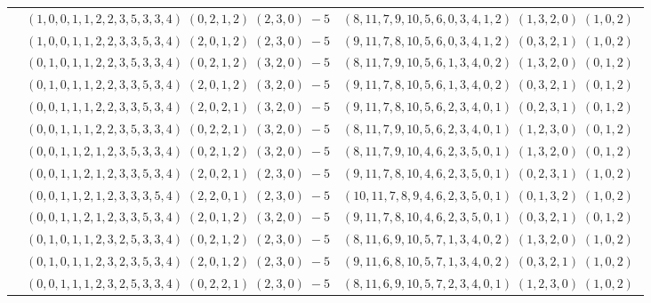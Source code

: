 \documentclass[11pt]{article}
\begin{document}
\begin{longtable}[l]{|c|c|c|}
 \cline{2-3} 
 & $(1 ,0 ,0 ,1 ,1 ,2 ,2 ,3 ,5 ,3 ,3 ,4) \;(0 ,2 ,1 ,2) \;(2 ,3 ,0) \;-5$ & $(8 ,11 ,7 ,9 ,10 ,5 ,6 ,0 ,3 ,4 ,1 ,2) \;(1 ,3 ,2 ,0) \;(1 ,0 ,2) \;$\\ 
 \cline{2-3} 
 & $(1 ,0 ,0 ,1 ,1 ,2 ,2 ,3 ,3 ,5 ,3 ,4) \;(2 ,0 ,1 ,2) \;(2 ,3 ,0) \;-5$ & $(9 ,11 ,7 ,8 ,10 ,5 ,6 ,0 ,3 ,4 ,1 ,2) \;(0 ,3 ,2 ,1) \;(1 ,0 ,2) \;$\\ 
 \cline{2-3} 
 & $(0 ,1 ,0 ,1 ,1 ,2 ,2 ,3 ,5 ,3 ,3 ,4) \;(0 ,2 ,1 ,2) \;(3 ,2 ,0) \;-5$ & $(8 ,11 ,7 ,9 ,10 ,5 ,6 ,1 ,3 ,4 ,0 ,2) \;(1 ,3 ,2 ,0) \;(0 ,1 ,2) \;$\\ 
 \cline{2-3} 
 & $(0 ,1 ,0 ,1 ,1 ,2 ,2 ,3 ,3 ,5 ,3 ,4) \;(2 ,0 ,1 ,2) \;(3 ,2 ,0) \;-5$ & $(9 ,11 ,7 ,8 ,10 ,5 ,6 ,1 ,3 ,4 ,0 ,2) \;(0 ,3 ,2 ,1) \;(0 ,1 ,2) \;$\\ 
 \cline{2-3} 
 & $(0 ,0 ,1 ,1 ,1 ,2 ,2 ,3 ,3 ,5 ,3 ,4) \;(2 ,0 ,2 ,1) \;(3 ,2 ,0) \;-5$ & $(9 ,11 ,7 ,8 ,10 ,5 ,6 ,2 ,3 ,4 ,0 ,1) \;(0 ,2 ,3 ,1) \;(0 ,1 ,2) \;$\\ 
 \cline{2-3} 
 & $(0 ,0 ,1 ,1 ,1 ,2 ,2 ,3 ,5 ,3 ,3 ,4) \;(0 ,2 ,2 ,1) \;(3 ,2 ,0) \;-5$ & $(8 ,11 ,7 ,9 ,10 ,5 ,6 ,2 ,3 ,4 ,0 ,1) \;(1 ,2 ,3 ,0) \;(0 ,1 ,2) \;$\\ 
 \cline{2-3} 
 & $(0 ,0 ,1 ,1 ,2 ,1 ,2 ,3 ,5 ,3 ,3 ,4) \;(0 ,2 ,1 ,2) \;(3 ,2 ,0) \;-5$ & $(8 ,11 ,7 ,9 ,10 ,4 ,6 ,2 ,3 ,5 ,0 ,1) \;(1 ,3 ,2 ,0) \;(0 ,1 ,2) \;$\\ 
 \cline{2-3} 
 & $(0 ,0 ,1 ,1 ,2 ,1 ,2 ,3 ,3 ,5 ,3 ,4) \;(2 ,0 ,2 ,1) \;(2 ,3 ,0) \;-5$ & $(9 ,11 ,7 ,8 ,10 ,4 ,6 ,2 ,3 ,5 ,0 ,1) \;(0 ,2 ,3 ,1) \;(1 ,0 ,2) \;$\\ 
 \cline{2-3} 
 & $(0 ,0 ,1 ,1 ,2 ,1 ,2 ,3 ,3 ,3 ,5 ,4) \;(2 ,2 ,0 ,1) \;(2 ,3 ,0) \;-5$ & $(10 ,11 ,7 ,8 ,9 ,4 ,6 ,2 ,3 ,5 ,0 ,1) \;(0 ,1 ,3 ,2) \;(1 ,0 ,2) \;$\\ 
 \cline{2-3} 
 & $(0 ,0 ,1 ,1 ,2 ,1 ,2 ,3 ,3 ,5 ,3 ,4) \;(2 ,0 ,1 ,2) \;(3 ,2 ,0) \;-5$ & $(9 ,11 ,7 ,8 ,10 ,4 ,6 ,2 ,3 ,5 ,0 ,1) \;(0 ,3 ,2 ,1) \;(0 ,1 ,2) \;$\\ 
 \cline{2-3} 
 & $(0 ,1 ,0 ,1 ,1 ,2 ,3 ,2 ,5 ,3 ,3 ,4) \;(0 ,2 ,1 ,2) \;(2 ,3 ,0) \;-5$ & $(8 ,11 ,6 ,9 ,10 ,5 ,7 ,1 ,3 ,4 ,0 ,2) \;(1 ,3 ,2 ,0) \;(1 ,0 ,2) \;$\\ 
 \cline{2-3} 
 & $(0 ,1 ,0 ,1 ,1 ,2 ,3 ,2 ,3 ,5 ,3 ,4) \;(2 ,0 ,1 ,2) \;(2 ,3 ,0) \;-5$ & $(9 ,11 ,6 ,8 ,10 ,5 ,7 ,1 ,3 ,4 ,0 ,2) \;(0 ,3 ,2 ,1) \;(1 ,0 ,2) \;$\\ 
 \cline{2-3} 
 & $(0 ,0 ,1 ,1 ,1 ,2 ,3 ,2 ,5 ,3 ,3 ,4) \;(0 ,2 ,2 ,1) \;(2 ,3 ,0) \;-5$ & $(8 ,11 ,6 ,9 ,10 ,5 ,7 ,2 ,3 ,4 ,0 ,1) \;(1 ,2 ,3 ,0) \;(1 ,0 ,2) \;$\\ 

\end{longtable}
\end{document}
